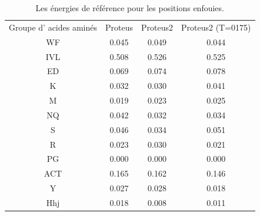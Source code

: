     \begin{table}[!htbp]
      \centering

      \begin{tabular}{cccc}

        \toprule
        Groupe d' acides aminés & Proteus & Proteus2 & Proteus2 (T=0175)\\
        \cmidrule{1-4}


        WF  & 0.045  &  0.049  & 0.044 \\
        IVL & 0.508  &  0.526  & 0.525 \\
        ED  & 0.069  &  0.074  & 0.078 \\
        K   & 0.032  &  0.030  & 0.041 \\
        M   & 0.019  &  0.023  & 0.025 \\
        NQ  & 0.042  &  0.032  & 0.034 \\
        S   & 0.046  &  0.034  & 0.051 \\
        R   & 0.023  &  0.030  & 0.021 \\
        PG  & 0.000  &  0.000  & 0.000 \\
        ACT & 0.165  &  0.162  & 0.146 \\
        Y   & 0.027  &  0.028  & 0.018 \\
        Hhj & 0.018  &  0.008  & 0.011 \\



        \bottomrule


      \end{tabular}      
      \caption{Les énergies de référence pour les positions enfouies.}
\label{tab:RefEner_groupes}      
    \end{table}




